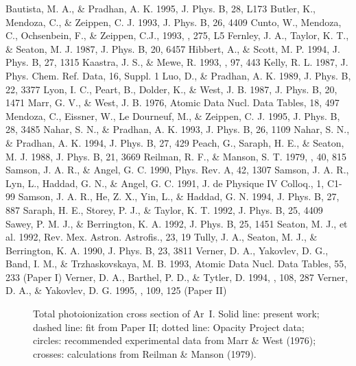 {\clearpage
\begin{references}
Bautista, M. A., \& Pradhan, A. K. 1995, J. Phys. B, 28, L173
Butler, K., Mendoza, C., \& Zeippen, C. J. 1993, J. Phys. B, 26, 4409
Cunto, W., Mendoza, C., Ochsenbein, F., \& Zeippen, C.J., 1993, \aap, 275, L5
Fernley, J. A., Taylor, K. T., \& Seaton, M. J. 1987, J. Phys. B, 20, 6457
 Hibbert, A., \& Scott, M. P. 1994, J. Phys. B, 27, 1315
 Kaastra, J. S., \& Mewe, R. 1993, \aaps, 97, 443
 Kelly, R. L. 1987, J. Phys. Chem. Ref. Data, 16, Suppl. 1
 Luo, D., \& Pradhan, A. K. 1989, J. Phys. B, 22, 3377
Lyon, I. C., Peart, B., Dolder, K., \& West, J. B. 1987, J. Phys. B, 20, 1471
Marr, G. V., \& West, J. B. 1976, Atomic Data Nucl. Data Tables, 18, 497
 Mendoza, C., Eissner, W., Le Dourneuf, M., \& Zeippen, 
C. J. 1995, J. Phys. B, 28, 3485 
 Nahar, S. N., \& Pradhan, A. K. 1993, J. Phys. B, 26, 1109
 Nahar, S. N., \& Pradhan, A. K. 1994, J. Phys. B, 27, 429
Peach, G., Saraph, H. E., \& Seaton, M. J. 1988, J. Phys. B, 21, 3669
 Reilman, R. F., \& Manson, S. T. 1979, \apjs, 40, 815
Samson, J. A. R., \& Angel, G. C. 1990, Phys. Rev. A, 42, 1307
 Samson, J. A. R., Lyn, L., Haddad, G. N., \& Angel, 
G. C. 1991, J. de Physique IV Colloq., 1, C1-99
 Samson, J. A. R., He, Z. X., Yin, L., \& Haddad, G. N. 
1994, J. Phys. B, 27, 887
Saraph, H. E., Storey, P. J., \& Taylor, K. T. 1992, J. Phys. B, 25, 4409
Sawey, P. M. J., \& Berrington, K. A. 1992, J. Phys. B, 25, 1451
Seaton, M. J., et al. 1992, Rev. Mex. Astron. Astrofis., 23, 19
Tully, J. A., Seaton, M. J., \& Berrington, K. A. 1990, J. Phys. B, 23, 3811
 Verner, D. A., Yakovlev, D. G., Band, I. M.,
\& Trzhaskovskaya, M. B. 1993, Atomic Data Nucl. Data Tables, 55, 233 (Paper I)
Verner, D. A., Barthel, P. D., \& Tytler, D. 1994, \aaps, 108, 287
Verner, D. A., \& Yakovlev, D. G. 1995, \aaps, 109, 125 (Paper II)
\end{references}

\clearpage

\begin{figure}
\caption{Total photoionization cross
section of Ar~I. Solid line: present work; dashed line: fit from
Paper II; dotted line: Opacity Project data; circles:
recommended experimental data from
Marr \& West (1976); crosses: calculations from Reilman \& Manson (1979).}
\end{figure}
 
}
